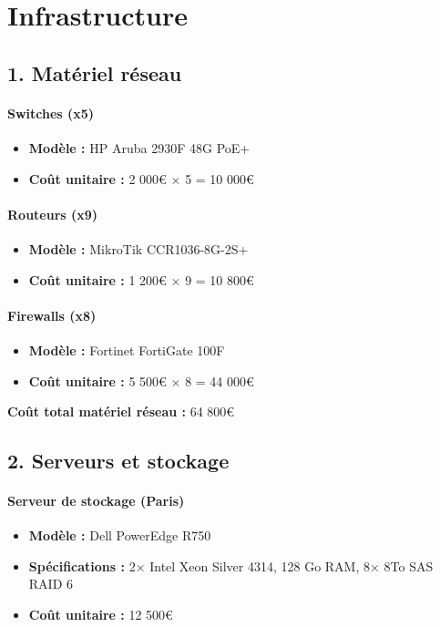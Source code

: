 \documentclass{report}
\begin{document}
\section*{\centering Infrastructure}
\vspace{0.2cm}
\subsection*{1. Matériel réseau}
\vspace{0.2cm}
\paragraph{Switches (x5)}
\begin{itemize}
    \item \textbf{Modèle :} HP Aruba 2930F 48G PoE+
    \item \textbf{Coût unitaire :} 2 000€ $\times$ 5 = 10 000€
\end{itemize}
\paragraph{Routeurs (x9)}
\begin{itemize}
    \item \textbf{Modèle :} MikroTik CCR1036-8G-2S+
    \item \textbf{Coût unitaire :} 1 200€ $\times$ 9 = 10 800€
\end{itemize}
\paragraph{Firewalls (x8)}
\begin{itemize}
    \item \textbf{Modèle :} Fortinet FortiGate 100F
    \item \textbf{Coût unitaire :} 5 500€ $\times$ 8 = 44 000€
\end{itemize}
\vspace{0.2cm}
\noindent \textbf{Coût total matériel réseau :} 64 800€
\vspace{0.5cm}
\subsection*{2. Serveurs et stockage}
\vspace{0.2cm}
\paragraph{Serveur de stockage (Paris)}
\begin{itemize}
    \item \textbf{Modèle :} Dell PowerEdge R750
    \item \textbf{Spécifications :} 2× Intel Xeon Silver 4314, 128 Go RAM, 8× 8To SAS RAID 6
    \item \textbf{Coût unitaire :} 12 500€
\end{itemize}
\end{document}
